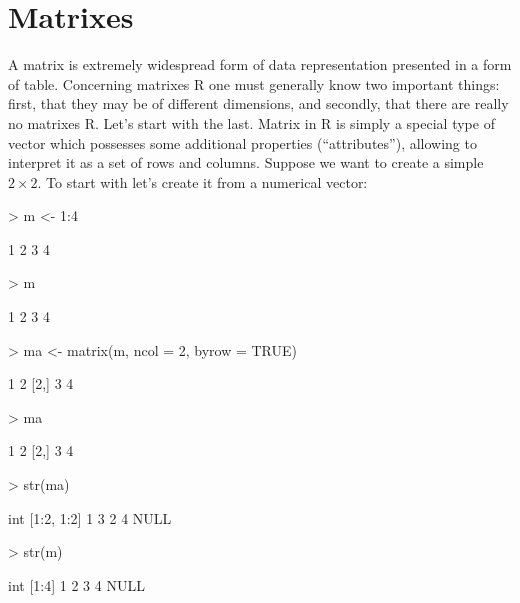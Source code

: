 \documentclass[a4paper,11pt]{scrartcl}
\begin{document}
\section{Matrixes}
\label{sec:matrix}

A matrix is extremely widespread form of data representation presented in a form of table. Concerning matrixes R one must generally know two important things: first, that they may be of different dimensions, and secondly, that there are really no matrixes R.
Let's start with the last. Matrix in R is simply a special type of vector which possesses some additional properties (“attributes”), allowing to interpret it as a set of rows and columns. Suppose we want to create a simple \(2\times2\). To start with let’s create it from a numerical vector:
\begin{Schunk}
\begin{Sinput}
> m <- 1:4
\end{Sinput}
\begin{Soutput}
[1] 1 2 3 4
\end{Soutput}
\begin{Sinput}
> m
\end{Sinput}
\begin{Soutput}
[1] 1 2 3 4
\end{Soutput}
\begin{Sinput}
> ma <- matrix(m, ncol = 2, byrow = TRUE)
\end{Sinput}
\begin{Soutput}
     [,1] [,2]
[1,]    1    2
[2,]    3    4
\end{Soutput}
\begin{Sinput}
> ma
\end{Sinput}
\begin{Soutput}
     [,1] [,2]
[1,]    1    2
[2,]    3    4
\end{Soutput}
\begin{Sinput}
> str(ma)
\end{Sinput}
\begin{Soutput}
 int [1:2, 1:2] 1 3 2 4
NULL
\end{Soutput}
\begin{Sinput}
> str(m)
\end{Sinput}
\begin{Soutput}
 int [1:4] 1 2 3 4
NULL
\end{Soutput}
\end{Schunk}
\end{document}
